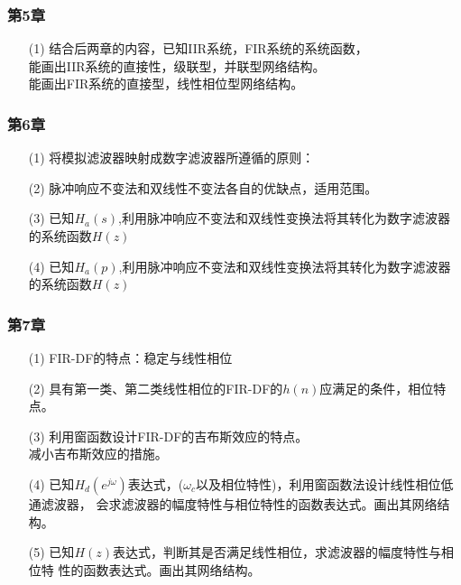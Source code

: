 \documentclass[notheorems,compress,mathserif,table]{beamer}
\newtheorem{dablock}{}
\begin{document}
\begin{frame}[shrink]\frametitle{第5章  }%
\begin{enumerate}
	\item [(1)] 结合后两章的内容，已知IIR系统，FIR系统的系统函数，\\
	     能画出IIR系统的直接性，级联型，并联型网络结构。\\
	     能画出FIR系统的直接型，线性相位型网络结构。
\end{enumerate}

\end{frame}
%
%
%
\begin{frame}[shrink]\frametitle{第6章   }%
\begin{enumerate}
	\item [(1)] 将模拟滤波器映射成数字滤波器所遵循的原则：
	\item [(2)] 脉冲响应不变法和双线性不变法各自的优缺点，适用范围。
	\item [(3)] 已知$ H_a(s) $,利用脉冲响应不变法和双线性变换法将其转化为数字滤波器的系统函数$ H(z) $
	\item [(4)] 已知$ H_a(p) $,利用脉冲响应不变法和双线性变换法将其转化为数字滤波器的系统函数$ H(z) $
\end{enumerate}

\end{frame}
%
%
%
\begin{frame}[shrink]\frametitle{第7章  }%
\begin{enumerate}
	\item [(1)] FIR-DF的特点：{\heiti 稳定}与{\heiti 线性相位}
	\item [(2)] 具有第一类、第二类线性相位的FIR-DF的$ h(n) $应满足的条件，相位特点。
	\item [(3)] 利用窗函数设计FIR-DF的吉布斯效应的特点。\\
	            减小吉布斯效应的措施。
	\item [(4)] 已知$ H_d(e^{j\omega}) $表达式，($ \omega_c $以及相位特性)，利用窗函数法设计线性相位低通滤波器，
	            会求滤波器的幅度特性与相位特性的函数表达式。画出其网络结构。
	\item [(5)] 已知$ H(z) $表达式，判断其是否满足线性相位，求滤波器的幅度特性与相位特	性的函数表达式。画出其网络结构。
\end{enumerate}

\end{frame}
\end{document}
